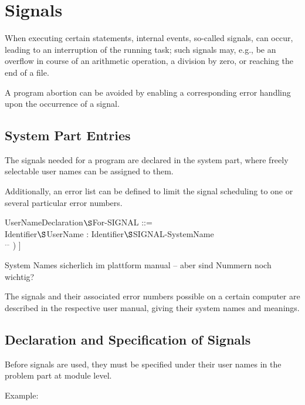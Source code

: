 \chapter{Signals}   %
\label{signals}

When executing certain statements, internal events, so-called signals,
can occur, leading to an interruption of the running task; such signals
may, e.g., be an overflow in course of an arithmetic operation, a
division by zero, or reaching the end of a file.

A program abortion can be avoided by enabling a corresponding error
handling upon the occurrence of a signal.

\section{System Part Entries}
The signals needed for a program are declared in the system part, where
freely selectable user names can be assigned to them.
\begin{removed} Additionally, an
error list can be defined to limit the signal scheduling to one or
several particular error numbers.

UserNameDeclaration$\S $For-SIGNAL ::= \\
\x Identifier$\S $UserName : Identifier$\S $SIGNAL-SystemName\\
\x \x [ ( Identifier$\S $ErrorNumber [ , Identifier$\S $ErrorNumber ] $^{...}$ ) ]
\end{removed}



\begin{discuss}
System Names sicherlich im plattform manual -- aber sind Nummern noch
wichtig?

The signals and their associated error numbers possible on a certain
computer are described in the respective user manual, giving their
system names and meanings.
\end{discuss}

\section{Declaration and Specification of Signals} 

Before signals are used, they must be specified under their user names
in the problem part at module level.

Example:

